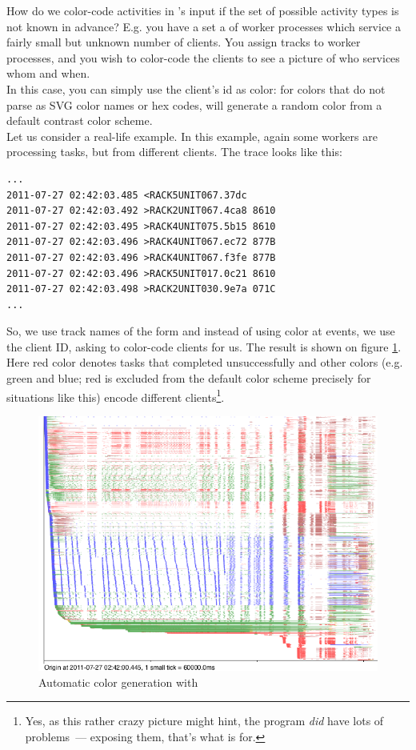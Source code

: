 \documentclass{article}
\begin{document}
How do we color-code activities in \splot{}'s input if the set of possible activity types is not known in advance? E.g. you have a set a of worker processes which service a fairly small but unknown number of clients. You assign tracks to worker processes, and you wish to color-code the clients to see a picture of who services whom and when.
\\
In this case, you can simply use the client's id as color: for colors that do not parse as SVG color names or hex codes, \splot{} will generate a random color from a default contrast color scheme.
\\
Let us consider a real-life example. In this example, again some workers are processing tasks, but from different clients.
The trace looks like this:
\begin{verbatim}
...
2011-07-27 02:42:03.485 <RACK5UNIT067.37dc
2011-07-27 02:42:03.492 >RACK2UNIT067.4ca8 8610
2011-07-27 02:42:03.495 >RACK4UNIT075.5b15 8610
2011-07-27 02:42:03.496 >RACK4UNIT067.ec72 877B
2011-07-27 02:42:03.496 >RACK4UNIT067.f3fe 877B
2011-07-27 02:42:03.496 >RACK5UNIT017.0c21 8610
2011-07-27 02:42:03.498 >RACK2UNIT030.9e7a 071C
...
\end{verbatim}
So, we use track names of the form  and instead of using color at \hlverb{>} events, we use the client ID, asking \splot{} to color-code clients for us. The result is shown on figure \ref{fig:splot-color-gen}. Here red color denotes tasks that completed unsuccessfully and other colors (e.g. green and blue; red is excluded from the default color scheme precisely for situations like this) encode different clients\footnote{Yes, as this rather crazy picture might hint, the program \emph{did} have lots of problems~--- exposing them, that's what \splot{} is for.}.

\begin{figure}[h]
\center
\includegraphics[width=\textwidth]{pics/splot/splot-color-gen.png}
\caption{Automatic color generation with \splot{}}
\label{fig:splot-color-gen}
\end{figure}
\end{document}

